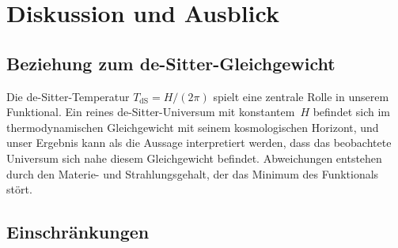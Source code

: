 \documentclass[12pt,a4paper]{article}
\theoremstyle{definition}
\theoremstyle{plain}
\theoremstyle{remark}
\begin{document}
\section{Diskussion und Ausblick}\label{sec:discussion}

\subsection{Beziehung zum de-Sitter-Gleichgewicht}

Die de-Sitter-Temperatur $T_{\mathrm{dS}} = H/(2\pi)$ spielt eine
zentrale Rolle in unserem Funktional. Ein reines de-Sitter-Universum
mit konstantem~$H$ befindet sich im thermodynamischen Gleichgewicht
mit seinem kosmologischen Horizont, und unser Ergebnis kann als die
Aussage interpretiert werden, dass das beobachtete Universum sich
nahe diesem Gleichgewicht befindet. Abweichungen entstehen durch den
Materie- und Strahlungsgehalt, der das Minimum des Funktionals st\"ort.

\subsection{Einschr\"ankungen}
\end{document}
